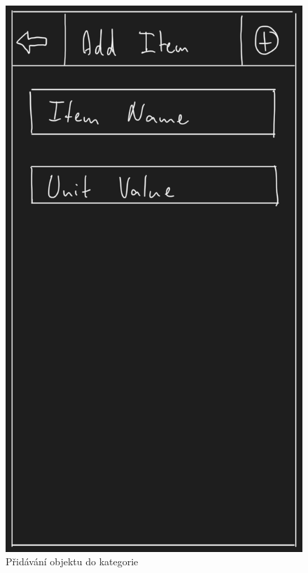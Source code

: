 \documentclass[12pt, titlepage]{article}
\begin{document}
\begin{figure}[ht]
	\centering
	\includegraphics[scale=0.43]{add_item}
	\caption{Přidávání objektu do kategorie}
	\label{fig:add_item}
\end{figure}
\end{document}
